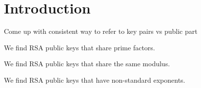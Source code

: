 \section{Introduction}

Come up with consistent way to refer to key pairs vs public part

We find RSA public keys that share prime factors.

We find RSA public keys that share the same modulus.

We find RSA public keys that have non-standard exponents.
